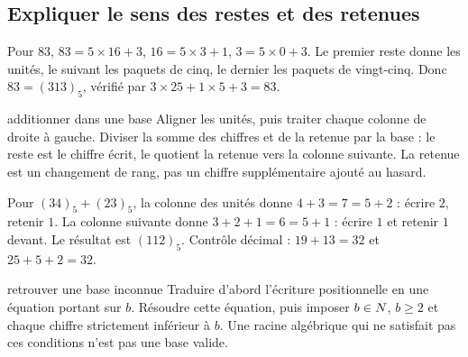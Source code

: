 \subsection*{Expliquer le sens des restes et des retenues}
\begin{exemple}
Pour $83$, $83=5\times16+3$, $16=5\times3+1$, $3=5\times0+3$. Le premier reste donne les unités, le suivant les paquets de cinq, le dernier les paquets de vingt-cinq. Donc $83=(313)_5$, vérifié par $3\times25+1\times5+3=83$.
\end{exemple}
\begin{methode}{additionner dans une base}
Aligner les unités, puis traiter chaque colonne de droite à gauche. Diviser la somme des chiffres et de la retenue par la base : le reste est le chiffre écrit, le quotient la retenue vers la colonne suivante. La retenue est un changement de rang, pas un chiffre supplémentaire ajouté au hasard.
\end{methode}
\begin{exemple}
Pour $(34)_5+(23)_5$, la colonne des unités donne $4+3=7=5+2$ : écrire $2$, retenir $1$. La colonne suivante donne $3+2+1=6=5+1$ : écrire $1$ et retenir $1$ devant. Le résultat est $(112)_5$. Contrôle décimal : $19+13=32$ et $25+5+2=32$.
\end{exemple}
\begin{methode}{retrouver une base inconnue}
Traduire d’abord l’écriture positionnelle en une équation portant sur $b$. Résoudre cette équation, puis imposer $b\in N$, $b\ge2$ et chaque chiffre strictement inférieur à $b$. Une racine algébrique qui ne satisfait pas ces conditions n’est pas une base valide.
\end{methode}

